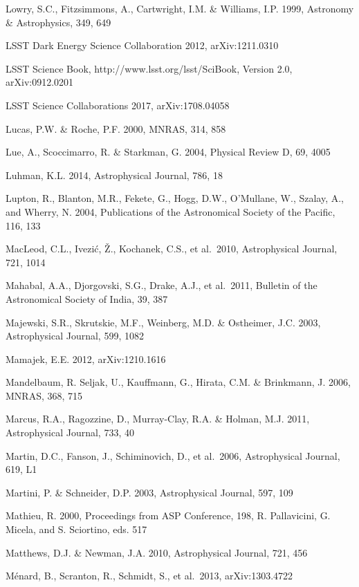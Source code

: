 \documentclass{emulateapj}
\begin{document}
\begin{thebibliography}{}
\bibitem[()]{} Lowry, S.C., Fitzsimmons, A., Cartwright, I.M. \& Williams, I.P. 1999, Astronomy \&
             Astrophysics, 349, 649

\bibitem[()]{} LSST Dark Energy Science Collaboration 2012, arXiv:1211.0310

\bibitem[()]{} LSST Science Book,
  http://www.lsst.org/lsst/SciBook,  Version 2.0, arXiv:0912.0201

\bibitem[()]{} LSST Science Collaborations 2017, arXiv:1708.04058

\bibitem[()]{} Lucas, P.W. \& Roche, P.F. 2000, MNRAS, 314, 858

\bibitem[()]{} Lue, A., Scoccimarro, R. \& Starkman, G. 2004, Physical Review D, 69, 4005

\bibitem[()]{} Luhman, K.L. 2014,  Astrophysical Journal, 786, 18

\bibitem[()]{} Lupton, R., Blanton, M.R., Fekete, G., Hogg, D.W.,
  O'Mullane, W., Szalay, A., and Wherry, N. 2004, Publications of the
  Astronomical Society of the Pacific, 116, 133

\bibitem[()]{} MacLeod, C.L., Ivezi\'{c}, \v{Z}., Kochanek, C.S., et al.~2010, Astrophysical Journal, 721, 1014

\bibitem[()]{} Mahabal, A.A., Djorgovski, S.G., Drake, A.J., et al.~2011, Bulletin of the Astronomical Society of India, 39, 387

\bibitem[()]{} Majewski, S.R., Skrutskie, M.F., Weinberg, M.D. \& Ostheimer, J.C. 2003,
             Astrophysical Journal, 599, 1082

\bibitem[()]{} Mamajek, E.E. 2012, arXiv:1210.1616

\bibitem[()]{} Mandelbaum, R. Seljak, U., Kauffmann, G., Hirata, C.M. \& Brinkmann, J. 2006, MNRAS, 368, 715

\bibitem[()]{} Marcus, R.A., Ragozzine, D., Murray-Clay, R.A. \& Holman, M.J. 2011, Astrophysical Journal, 733, 40

\bibitem[()]{} Martin, D.C., Fanson, J., Schiminovich, D., et al.~2006, Astrophysical Journal, 619, L1

\bibitem[()]{} Martini, P. \& Schneider, D.P. 2003, Astrophysical Journal, 597, 109

\bibitem[()]{} Mathieu, R. 2000, Proceedings from ASP Conference, 198, R. Pallavicini, G. Micela, and
             S. Sciortino, eds. 517

\bibitem[()]{} Matthews, D.J. \& Newman, J.A. 2010, Astrophysical Journal, 721, 456

\bibitem[()]{} M\'{e}nard, B., Scranton, R., Schmidt, S., et al.~2013, arXiv:1303.4722


\end{thebibliography}
\end{document}
